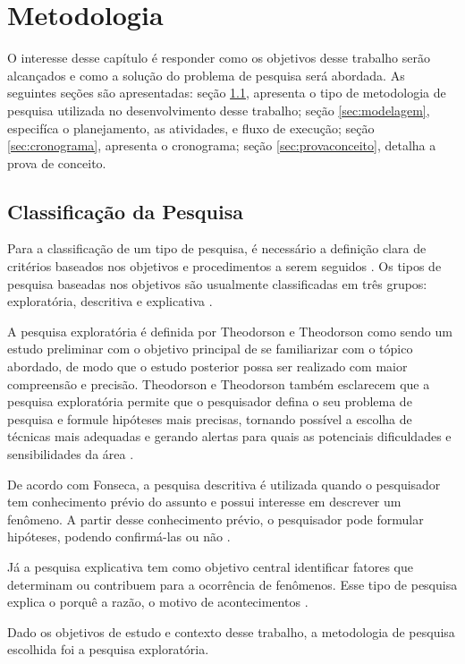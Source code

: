 \chapter[Metodologia]{Metodologia}

O interesse desse capítulo é responder como os objetivos desse trabalho serão
alcançados e como a solução do problema de pesquisa será abordada. As seguintes
seções são apresentadas: seção \ref{sec:classificacao}, apresenta o tipo de
metodologia de pesquisa utilizada no desenvolvimento desse trabalho; seção \ref{sec:modelagem},
especifíca o planejamento, as atividades, e fluxo de execução; seção \ref{sec:cronograma},
apresenta o cronograma; seção \ref{sec:provaconceito}, detalha a prova de conceito.

\section{Classificação da Pesquisa}
\label{sec:classificacao}

Para a classificação de um tipo de pesquisa, é necessário a definição clara de critérios baseados nos objetivos e procedimentos a serem seguidos \cite{gil2002}. Os tipos de pesquisa baseadas nos objetivos são usualmente classificadas em três grupos: exploratória, descritiva e explicativa \cite{gil2002}.

A pesquisa exploratória é definida por Theodorson e Theodorson como sendo um estudo preliminar com o objetivo principal de se familiarizar com o tópico abordado, de modo que o estudo posterior possa ser realizado com maior compreensão e precisão. Theodorson e Theodorson também esclarecem que a pesquisa exploratória permite que o pesquisador defina o seu problema de pesquisa e formule hipóteses mais precisas, tornando possível a escolha de técnicas mais adequadas e gerando alertas para quais as potenciais dificuldades e sensibilidades da área \cite{theodorson1970}.

De acordo com Fonseca, a pesquisa descritiva é utilizada quando o pesquisador tem conhecimento prévio do assunto e possui interesse em descrever um fenômeno. A partir desse conhecimento prévio, o pesquisador pode formular hipóteses, podendo confirmá-las ou não \cite{fonseca2002}.

Já a pesquisa explicativa tem como objetivo central identificar fatores que determinam ou contribuem para a ocorrência de fenômenos. Esse tipo de pesquisa explica o porquê a razão, o motivo de acontecimentos \cite{gil2002}.

Dado os objetivos de estudo e contexto desse trabalho, a metodologia de pesquisa escolhida foi a pesquisa exploratória.

